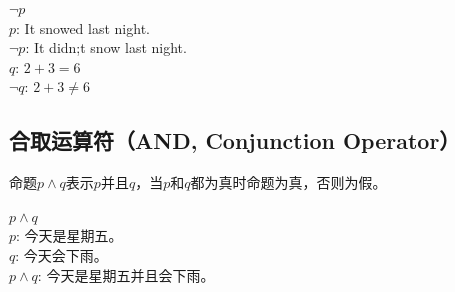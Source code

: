\begin{table}[H]
	\centering
	\caption{NOT真值表}
\end{table}

\begin{tcolorbox}
	$ \neg p $\\
	$ p $: It snowed last night.\\
	$ \neg p $: It didn;t snow last night.\\
	$ q $: $ 2 + 3 = 6 $\\
	$ \neg q $: $ 2 + 3 \ne 6 $
\end{tcolorbox}

\vspace{0.5cm}

\subsection{合取运算符（AND, Conjunction Operator）}

命题$ p \wedge q $表示$ p $并且$ q $，当$ p $和$ q $都为真时命题为真，否则为假。

\begin{table}[H]
	\centering
	\caption{AND真值表}
\end{table}

\begin{tcolorbox}
	$ p \wedge q $\\
	$ p $: 今天是星期五。\\
	$ q $: 今天会下雨。\\
	$ p \wedge q $: 今天是星期五并且会下雨。
\end{tcolorbox}

